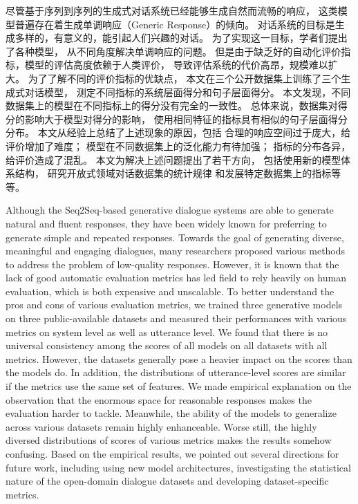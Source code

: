 \begin{cabstract}
    尽管基于序列到序列的生成式对话系统已经能够生成自然而流畅的响应，
    这类模型普遍存在着生成单调响应（Generic Response）的倾向。
    对话系统的目标是生成多样的，有意义的，能引起人们兴趣的对话。
    为了实现这一目标，学者们提出了各种模型，
    从不同角度解决单调响应的问题。
    但是由于缺乏好的自动化评价指标，模型的评估高度依赖于人类评价，
    导致评估系统的代价高昂，规模难以扩大。
    为了了解不同的评价指标的优缺点，
    本文在三个公开数据集上训练了三个生成式对话模型，
    测定不同指标的系统层面得分和句子层面得分。
    本文发现，不同数据集上的模型在不同指标上的得分没有完全的一致性。
    总体来说，数据集对得分的影响大于模型对得分的影响，
    使用相同特征的指标具有相似的句子层面得分分布。
    本文从经验上总结了上述现象的原因，包括
    合理的响应空间过于庞大，给评价增加了难度；
    模型在不同数据集上的泛化能力有待加强；
    指标的分布各异，给评价造成了混乱。
    本文为解决上述问题提出了若干方向，
    包括使用新的模型体系结构，
    研究开放式领域对话数据集的统计规律
    和发展特定数据集上的指标等等。
\end{cabstract}

\begin{eabstract}
    Although the Seq2Seq-based generative dialogue systems are
    able to generate natural and
    fluent responses,
    they have been widely known for preferring to generate
    simple and repeated responses.
    Towards the goal of generating diverse, meaningful and
    engaging dialogues,
    many researchers proposed various methods to address the
    problem of low-quality responses.
    However, it is known that the
    lack of good automatic evaluation metrics
    has led field to rely heavily on human evaluation,
    which is both expensive and unscalable.
    To better understand the pros and cons of various
    evaluation metrics,
    we trained three generative models on
    three public-available datasets and measured their
    performances with various metrics on system level
    as well as utterance level.
    We found that there is no universal consistency among
    the scores of all models on all datasets with all metrics.
    However, the datasets generally pose a heavier impact on
    the scores than the models do.
    In addition, the distributions of
    utterance-level scores are similar if the metrics use the same
    set of features.
    We made empirical explanation on the
    observation that the enormous space for reasonable responses
    makes the evaluation harder to tackle.
    Meanwhile, the ability of the models to generalize across
    various datasets remain highly enhanceable.
    Worse still, the highly diversed distributions of scores
    of various metrics makes the results somehow confusing.
    Based on the empirical results, we pointed out several
    directions for future work, including using new model
    architectures, investigating the statistical nature of
    the open-domain dialogue datasets and
    developing dataset-specific metrics.
\end{eabstract}
